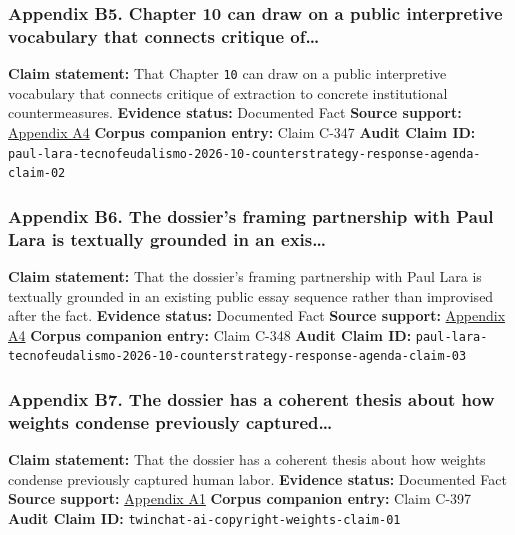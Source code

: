 \documentclass[
  american,
  11pt,
  letterpaper,
]{article}
\begin{document}
\subsubsection{Appendix B5. Chapter 10 can draw on a public interpretive
vocabulary that connects critique
of\ldots{}}\label{appendix-b5-chapter-10-can-draw-on-a-public-interpretive-vocabulary-that-connects-critique-of}

\textbf{Claim statement:} That Chapter \texttt{10} can draw on a public
interpretive vocabulary that connects critique of extraction to concrete
institutional countermeasures. \textbf{Evidence status:} Documented Fact
\textbf{Source support:}
\hyperref[appendix-a4-c-mo-hackear-al-tecnofeudalismo]{Appendix A4}
\textbf{Corpus companion entry:} Claim C-347 \textbf{Audit Claim ID:}
\texttt{paul-lara-tecnofeudalismo-2026-10-counterstrategy-response-agenda-claim-02}

\subsubsection{Appendix B6. The dossier's framing partnership with Paul
Lara is textually grounded in an
exis\ldots{}}\label{appendix-b6-the-dossier-s-framing-partnership-with-paul-lara-is-textually-grounded-in-an-exis}

\textbf{Claim statement:} That the dossier's framing partnership with
Paul Lara is textually grounded in an existing public essay sequence
rather than improvised after the fact. \textbf{Evidence status:}
Documented Fact \textbf{Source support:}
\hyperref[appendix-a4-c-mo-hackear-al-tecnofeudalismo]{Appendix A4}
\textbf{Corpus companion entry:} Claim C-348 \textbf{Audit Claim ID:}
\texttt{paul-lara-tecnofeudalismo-2026-10-counterstrategy-response-agenda-claim-03}

\subsubsection{Appendix B7. The dossier has a coherent thesis about how
weights condense previously
captured\ldots{}}\label{appendix-b7-the-dossier-has-a-coherent-thesis-about-how-weights-condense-previously-captured}

\textbf{Claim statement:} That the dossier has a coherent thesis about
how weights condense previously captured human labor. \textbf{Evidence
status:} Documented Fact \textbf{Source support:}
\hyperref[appendix-a1-ai-copyright-weights-a-new-frontier-in-intellectual-property-law]{Appendix
A1} \textbf{Corpus companion entry:} Claim C-397 \textbf{Audit Claim
ID:} \texttt{twinchat-ai-copyright-weights-claim-01}
\end{document}
